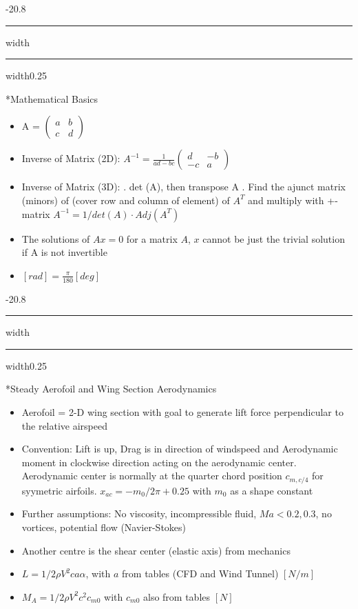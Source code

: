 \documentclass[8pt, landscape, fleqn]{scrartcl}
\makeatletter
\renewcommand{\section}{\@startsection{section}{1}{0mm}%
{-2\baselineskip}{0.8\baselineskip}%
{\hrule depth 0.2pt width\columnwidth\hrule depth1.5pt
width0.25\columnwidth\vspace*{1.2em}\Large\bfseries\rmfamily}}
\renewcommand{\subsection}{\@startsection{subsection}{1}{0mm}%
{-2\baselineskip}{0.8\baselineskip}%
{\hrule depth 0.2pt width\columnwidth\hrule depth0.75pt
width0.25\columnwidth\vspace*{1.2em}\large\bfseries\rmfamily}}
\makeatother
\begin{document}
\begin{multicols*}{3}
\subsection*{Mathematical Basics}

\begin{itemize}
    \item A = $\begin{pmatrix} a & b \\ c & d
    \end{pmatrix}$
    \item Inverse of Matrix (2D): $A^{-1} = \frac{1}{ad-bc} \begin{pmatrix} d & -b \\ -c & a
    \end{pmatrix}$
    \item Inverse of Matrix (3D): 
        . det (A), then transpose A
        . Find the ajunct matrix (minors) of
        \subitem (cover row and column of element) of $A^T$ 
        \subitem and multiply with +- matrix
        \subitem $A^{-1} = 1/det(A)\cdot Adj(A^T)$
    \item The solutions of $A x = 0$ for a matrix $A$, $x$ cannot be just the trivial solution if A is not invertible
    \item $[rad] = \frac{\pi}{180} [deg]$
\end{itemize}



\section*{Steady Aerofoil and Wing Section Aerodynamics}

\begin{itemize}
    \item Aerofoil = 2-D wing section with goal to generate lift force perpendicular to the relative airspeed
    \item Convention: Lift is up, Drag is in direction of windspeed and Aerodynamic moment in clockwise direction acting on the aerodynamic center. Aerodynamic center is normally at the quarter chord position $c_{m,c/4}$ for syymetric airfoils. $x_{ac} = -m_0/2\pi +0.25$ with $m_0$ as a shape constant 
    \item Further assumptions: No viscosity, incompressible fluid, $Ma < 0.2,0.3$, no vortices, potential flow (Navier-Stokes)
    \item Another centre is the shear center (elastic axis) from mechanics
    \item $L = 1/2\rho V^2 c a \alpha$, with $a$ from tables (CFD and Wind Tunnel) $[N/m]$
    \item $M_A = 1/2\rho V^2c^2 c_{m0}$ with $c_{m0}$ also from tables $[N]$
\end{itemize}


\end{multicols*}
\end{document}
